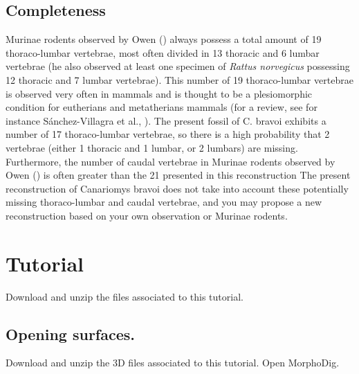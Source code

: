 \documentclass[12pt, a4paper]{book}
\begin{document}
\subsection{Completeness}
Murinae rodents observed by Owen (\citep{Owen1853}) always possess a total amount of 19 thoraco-lumbar
vertebrae, most often divided in 13 thoracic and 6 lumbar vertebrae (he also observed at least one
specimen of \textit{Rattus norvegicus} possessing 12 thoracic and 7 lumbar vertebrae). This number of 19
thoraco-lumbar vertebrae is observed very often in mammals and is thought to be a plesiomorphic
condition for eutherians and metatherians mammals (for a review, see for instance Sánchez-Villagra
et al., \citep{SanchezVillagra2007}). The present fossil of C. bravoi exhibits a number of 17 thoraco-lumbar vertebrae, so
there is a high probability that 2 vertebrae (either 1 thoracic and 1 lumbar, or 2 lumbars) are missing.
Furthermore, the number of caudal vertebrae in Murinae rodents observed by Owen (\citep{Owen1853}) is
often greater than the 21 presented in this reconstruction The present reconstruction of Canariomys
bravoi does not take into account these potentially missing thoraco-lumbar and caudal vertebrae, and
you may propose a new reconstruction based on your own observation or Murinae rodents.

\section{Tutorial}
		Download and unzip the files associated to this tutorial.
\subsection{Opening surfaces.}

Download and unzip the 3D files associated to this tutorial. Open MorphoDig.
\end{document}
